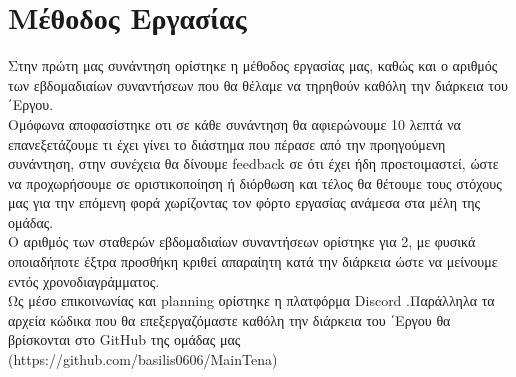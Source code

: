 \documentclass[11pt]{scrartcl} %
\begin{document}
\section{Μέθοδος Εργασίας}
Στην πρώτη μας συνάντηση ορίστηκε η μέθοδος εργασίας μας, καθώς και ο αριθμός των εβδομαδιαίων συναντήσεων που θα θέλαμε να τηρηθούν καθόλη την διάρκεια του ΄Εργου.\\
Ομόφωνα αποφασίστηκε οτι σε κάθε συνάντηση θα αφιερώνουμε 10 λεπτά να επανεξετάζουμε τι έχει γίνει το διάστημα που πέρασε από την προηγούμενη συνάντηση, στην συνέχεια θα δίνουμε feedback σε ότι έχει ήδη προετοιμαστεί, ώστε να προχωρήσουμε σε οριστικοποίηση ή διόρθωση και τέλος θα θέτουμε τους στόχους μας για την επόμενη φορά χωρίζοντας τον φόρτο εργασίας ανάμεσα στα μέλη της ομάδας. \\
Ο αριθμός των σταθερών εβδομαδιαίων συναντήσεων ορίστηκε για 2, με φυσικά οποιαδήποτε έξτρα προσθήκη κριθεί απαραίητη κατά την διάρκεια ώστε να μείνουμε εντός χρονοδιαγράμματος. \\
Ως μέσο επικοινωνίας και planning ορίστηκε η πλατφόρμα Discord .Παράλληλα τα αρχεία κώδικα που θα επεξεργαζόμαστε καθόλη την διάρκεια του ΄Εργου θα βρίσκονται στο GitHub της ομάδας μας (https://github.com/basilis0606/MainTena)



% 
\end{document}
